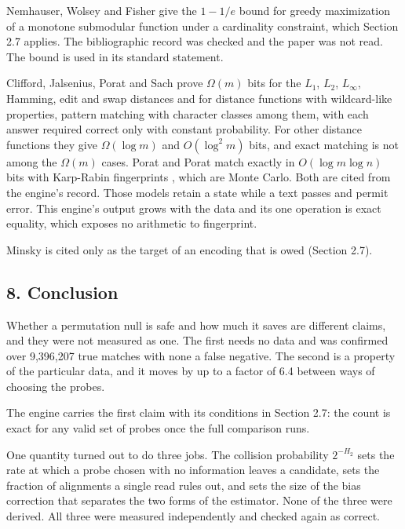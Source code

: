 Nemhauser, Wolsey and Fisher \cite{src:Nemhauser-Wolsey-and-Fisher} give the \(1 - 1/e\) bound for greedy maximization of a monotone submodular function under a cardinality constraint, which Section 2.7 applies. The bibliographic record was checked and the paper was not read. The bound is used in its standard statement.

Clifford, Jalsenius, Porat and Sach \cite{src:Clifford-Jalsenius-Porat-and-Sach} prove \(\Omega(m)\) bits for the \(L_1\), \(L_2\), \(L_\infty\), Hamming, edit and swap distances and for distance functions with wildcard-like properties, pattern matching with character classes among them, with each answer required correct only with constant probability. For other distance functions they give \(\Omega(\log m)\) and \(O(\log^2 m)\) bits, and exact matching is not among the \(\Omega(m)\) cases. Porat and Porat \cite{src:Porat-and-Porat} match exactly in \(O(\log m \log n)\) bits with Karp-Rabin fingerprints \cite{src:Karp-Rabin}, which are Monte Carlo. Both are cited from the engine's record. Those models retain a state while a text passes and permit error. This engine's output grows with the data and its one operation is exact equality, which exposes no arithmetic to fingerprint.

Minsky \cite{src:Minsky} is cited only as the target of an encoding that is owed (Section 2.7).

\subsection{8. Conclusion}

Whether a permutation null is safe and how much it saves are different claims, and they were not
measured as one. The first needs no data and was confirmed over 9,396,207 true matches with none a
false negative. The second is a property of the particular data, and it moves by up to a factor of
6.4 between ways of choosing the probes.

The engine carries the first claim with its conditions in Section 2.7: the count is exact for any
valid set of probes once the full comparison runs.

One quantity turned out to do three jobs. The collision probability \(2^{-H_2}\) sets the rate at
which a probe chosen with no information leaves a candidate, sets the fraction of alignments a
single read rules out, and sets the size of the bias correction that separates the two forms of the
estimator. None of the three were derived. All three were measured independently and checked again
as correct.

